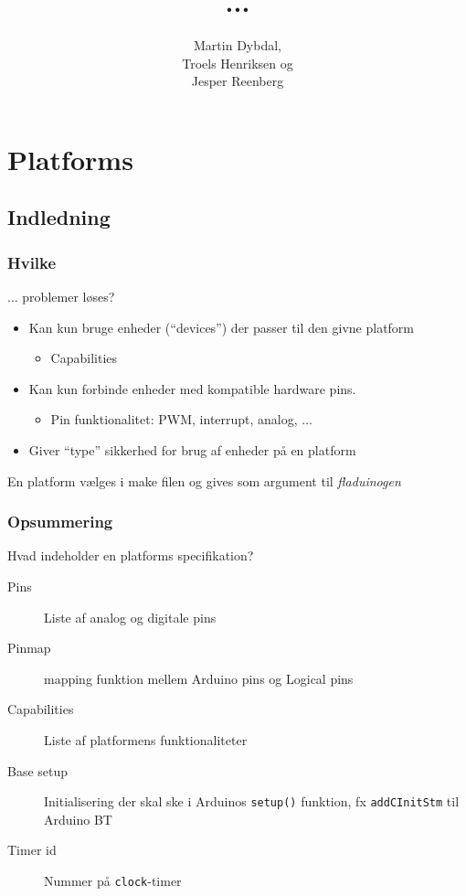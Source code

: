 \documentclass[t]{beamer}
\title{...}
\author{Martin Dybdal, \\
Troels Henriksen og \\
Jesper Reenberg
}
\begin{document}
\frame{\titlepage}

\section[Outline]{}
\frame{\tableofcontents}


\section{Platforms}

\subsection{Indledning}

\begin{frame}
  \frametitle{Hvilke}
  
  ... problemer løses?

  \begin{itemize}
  \item Kan kun bruge enheder ("`devices"') der passer til den givne platform
    \begin{itemize}
    \item Capabilities
    \end{itemize}
  \item Kan kun forbinde enheder med kompatible hardware pins.
    \begin{itemize}
    \item Pin funktionalitet: PWM, interrupt, analog, ...
    \end{itemize}
  \item Giver "`type"' sikkerhed for brug af enheder på en platform
  \end{itemize}  

  En platform vælges i make filen og gives som argument til \textit{fladuinogen}

\end{frame}


\begin{frame}
  \frametitle{Opsummering}

  Hvad indeholder en platforms specifikation?
  \begin{description}
  \item [Pins] Liste af analog og digitale pins
  \item [Pinmap] mapping funktion mellem Arduino pins og Logical pins
  \item [Capabilities] Liste af platformens funktionaliteter 
  \item [Base setup] Initialisering der skal ske i Arduinos \texttt{setup()}
    funktion, fx \texttt{addCInitStm} til Arduino BT
  \item [Timer id] Nummer på \texttt{clock}-timer
  \end{description}
\end{frame}
\end{document}
